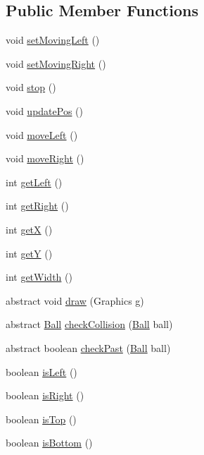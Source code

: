 \subsection*{Public Member Functions}
\begin{DoxyCompactItemize}
\item 
void \hyperlink{classbrick_breaker_1_1_racket_a350fa11540f07d2eed108a1aa75240e2}{setMovingLeft} ()
\item 
void \hyperlink{classbrick_breaker_1_1_racket_ac2bdea9a9f15d06648f2c2094ff123ba}{setMovingRight} ()
\item 
void \hyperlink{classbrick_breaker_1_1_racket_a1d5ee505bd935fa6b8ea6001c15a57b9}{stop} ()
\item 
void \hyperlink{classbrick_breaker_1_1_racket_ab439c6379d04064940f4a09007d5fe4c}{updatePos} ()
\item 
void \hyperlink{classbrick_breaker_1_1_racket_ab92ecb01070ce2fdefd99c3cc5212994}{moveLeft} ()
\item 
void \hyperlink{classbrick_breaker_1_1_racket_a755ac54ffa2ff2013442cda726fcf268}{moveRight} ()
\item 
int \hyperlink{classbrick_breaker_1_1_racket_a8d29bc2897ed97686e2be3e96308629b}{getLeft} ()
\item 
int \hyperlink{classbrick_breaker_1_1_racket_ad947f4853fbe782ab81e5a90e87ec360}{getRight} ()
\item 
int \hyperlink{classbrick_breaker_1_1_racket_ac70c03dfe6eff9485e79e1430a0a2ab0}{getX} ()
\item 
int \hyperlink{classbrick_breaker_1_1_racket_a229e48b5cacbc3921f8c626b77489e9b}{getY} ()
\item 
int \hyperlink{classbrick_breaker_1_1_racket_a32acec6ccc8fd726507697371bcde2c0}{getWidth} ()
\item 
abstract void \hyperlink{classbrick_breaker_1_1_racket_a6ca0308def67e0955522a0e0beb430e9}{draw} (Graphics g)
\item 
abstract \hyperlink{classbrick_breaker_1_1_ball}{Ball} \hyperlink{classbrick_breaker_1_1_racket_a81880bdbdfda6ec88d1d4e7fc72f8f74}{checkCollision} (\hyperlink{classbrick_breaker_1_1_ball}{Ball} ball)
\item 
abstract boolean \hyperlink{classbrick_breaker_1_1_racket_a129dbc802cd26299ebca916283edbe27}{checkPast} (\hyperlink{classbrick_breaker_1_1_ball}{Ball} ball)
\item 
boolean \hyperlink{classbrick_breaker_1_1_racket_af8ef3d348dca4cc1daad627826baea56}{isLeft} ()
\item 
boolean \hyperlink{classbrick_breaker_1_1_racket_ad1d76aea1bd7dea3c4114c8c585150ed}{isRight} ()
\item 
boolean \hyperlink{classbrick_breaker_1_1_racket_a0bd80cbd11ffe9afd6212e2d96a88554}{isTop} ()
\item 
boolean \hyperlink{classbrick_breaker_1_1_racket_a908f0a42e73739db9fd0734d6a4fdb2f}{isBottom} ()
\end{DoxyCompactItemize}
